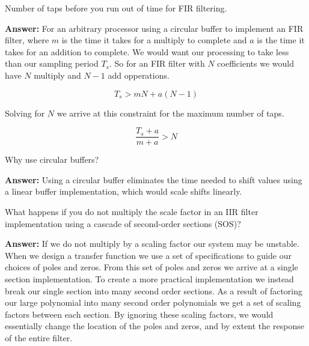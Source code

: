 \documentclass{article}
\begin{document}
\begin{enumerate}
  \begin{item}
    Number of taps before you run out of time for FIR filtering.

  \textbf{Answer:}
    For an arbitrary processor using a circular buffer to implement an FIR filter, where $m$ is the time it takes for a multiply to complete and $a$ is the time it takes for an addition to complete.
    We would want our processing to take less than our sampling period $T_s$.
    So for an FIR filter with $N$ coefficients we  would have $N$ multiply and $N - 1$ add opperations.

    \begin{equation}
      T_s > mN + a(N - 1)
    \end{equation}

    Solving for $N$ we arrive at this constraint for the maximum number of taps.

    \begin{equation}
      \frac{T_s + a}{m + a} > N
    \end{equation}
  \end{item}

  \begin{item}
    Why use circular buffers?

  \textbf{Answer:}
    Using a circular buffer eliminates the time needed to shift values using a linear buffer implementation, which would scale shifts linearly.

  \end{item}

  \begin{item}
    What happens if you do not multiply the scale factor in an IIR filter implementation using a cascade of second-order sections (SOS)?

  \textbf{Answer:}
    If we do not multiply by a scaling factor our system may be unstable.
    When we design a transfer function we use a set of specifications to guide our choices of poles and zeros.
    From this set of poles and zeros we arrive at a single section implementation.
    To create a more practical implementation we instead break our single section into many second order sections.
    As a result of factoring our large polynomial into many second order polynomials we get a set of scaling factors between each section.
    By ignoring these scaling factors, we would essentially change the location of the poles and zeros, and by extent the response of the entire filter.
  \end{item}


\end{enumerate}
\end{document}
